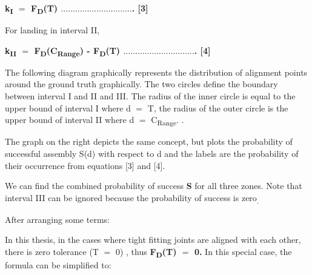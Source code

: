 \textbf{k\textsubscript{I} $=$ F\textsubscript{D}(T) $\ldots$$\ldots$$\ldots$$\ldots$$\ldots$$\ldots$$\ldots$$\ldots$$\ldots$$\ldots$. [3]}

For landing in interval II, 

\textbf{k\textsubscript{II} $=$ F\textsubscript{D}(C\textsubscript{Range}) - F\textsubscript{D}(T) $\ldots$$\ldots$$\ldots$$\ldots$$\ldots$$\ldots$$\ldots$$\ldots$$\ldots$$\ldots$. [4]}

The following diagram graphically represents the distribution of alignment points around the ground truth graphically. The two circles define the boundary between interval I and II and III. The radius of the inner circle is equal to the upper bound of interval I where d $=$ T, the radius of the outer circle is the upper bound of interval II where d $=$ C\textsubscript{Range}. . 

The graph on the right depicts the same concept, but plots the probability of successful assembly S(d) with respect to d and the labels are the probability of their occurrence from equations [3] and [4].



We can find the combined probability of success \textbf{S }for all three zones. Note that interval III can be ignored because the probability of success is zero\textsubscript{. }



After arranging some terms:



In this thesis, in the cases where tight fitting joints are aligned with each other, there is zero tolerance (T $=$ 0) , thus \textbf{F\textsubscript{D}(T) $=$ 0.} In this special case, the formula can be simplified to:

